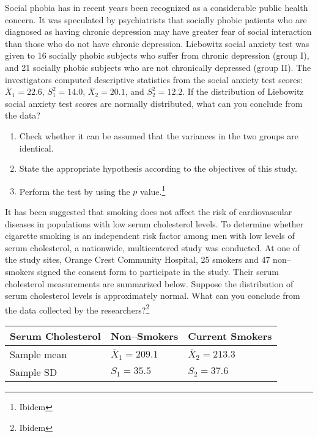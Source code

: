\begin{problem}  %
Social phobia has in recent years been recognized as a considerable
public health concern. It was speculated by psychiatrists that
socially phobic patients who are diagnosed as having chronic
depression may have greater fear of social interaction than those who
do not have chronic depression. Liebowitz social anxiety test was
given to 16 socially phobic subjects who suffer from chronic
depression (group I), and 21 socially phobic subjects who are not
chronically depressed (group II). The investigators computed
descriptive statistics from the social anxiety test scores: $\overline{X}_1 =
22.6$, $S_1^2 = 14.0$, $\overline{X}_2 = 20.1$, and $S_2^2 = 12.2$. If the
distribution of Liebowitz social anxiety test scores are normally
distributed,  what can you conclude from the data?
\begin{enumerate}
\item Check whether it can be assumed that the variances in the two
  groups are identical.
\item State the appropriate hypothesis according to the objectives of
  this study. 
\item  Perform the test by using the $p$ value.\footnote{Ibidem}
\end{enumerate}
\end{problem}
\begin{problem} %
It has been suggested that smoking does not affect the risk of
cardiovascular diseases in populations with low serum cholesterol
levels. To determine whether cigarette smoking is an independent risk
factor among men with low levels of serum cholesterol, a nationwide,
multicentered study was conducted. At one of the study sites, Orange
Crest Community Hospital, 25 smokers and 47 non--smokers signed the
consent form to participate in the study. Their serum cholesterol
measurements are summarized below. Suppose the distribution of serum
cholesterol levels is approximately normal. 
 What can you conclude from the  data collected by the researchers?\footnote{Ibidem}
 \begin{center}
\begin{tabular}{|l|l|l|}
\hline   Serum Cholesterol & Non--Smokers & Current Smokers \\
\hline  Sample mean & $\overline{X}_1=209.1$ & $ \overline{X}_2=213.3$ \\
Sample SD & $S_1=35.5$ & $S_2=37.6$ \\
\hline  
\end{tabular}   
 \end{center}
\end{problem}
